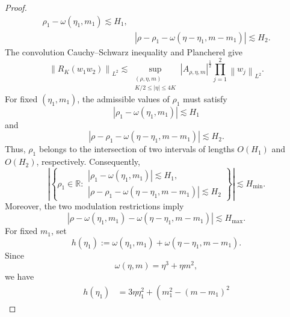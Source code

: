 \documentclass[12pt,oneside,reqno]{amsart}
\numberwithin{equation}{section}
\theoremstyle{plain}
\def\R{{\mathbb R}}
\newcommand{\abs}[1]{%
    \left|#1\right|%
}
\newcommand{\Lpn}[2]{%
    \left\lVert #1\right\rVert_{L^{#2}}%
}
\begin{document}
\begin{proof}
\begin{equation}
\begin{aligned}
{        \rho_1-\omega(\eta_1,m_1)
    }
    \lesssim H_1,
    \\
    &\abs{
        \rho-\rho_1
        -
        \omega(\eta-\eta_1,m-m_1)
    }
    \lesssim H_2.
\end{aligned}
\end{equation}
The convolution Cauchy--Schwarz inequality and Plancherel give
\begin{equation}
\label{eq:case6-convolution-CS}
    \Lpn{R_K(w_1w_2)}{2}
    \lesssim
    \sup_{\substack{
        (\rho,\eta,m)\\
        K/2\leq\abs{\eta}\leq4K
    }}
    \abs{A_{\rho,\eta,m}}^{\frac12}
    \prod_{j=1}^2
    \Lpn{w_j}{2}.
\end{equation}
For fixed $(\eta_1,m_1)$, the admissible values of $\rho_1$ must satisfy
\begin{equation}
    \abs{\rho_1-\omega(\eta_1,m_1)}
    \lesssim H_1
\end{equation}
and
\begin{equation}
    \abs{
        \rho-\rho_1-\omega(\eta-\eta_1,m-m_1)
    }
    \lesssim H_2.
\end{equation}
Thus, $\rho_1$ belongs to the intersection of two intervals of lengths
$O(H_1)$ and $O(H_2)$, respectively. Consequently,
\begin{equation}
\label{eq:case6-rho1-fiber}
\left|
\left\{
\rho_1\in\R:
\begin{array}{l}
\abs{\rho_1-\omega(\eta_1,m_1)}\lesssim H_1,\\[1mm]
\abs{\rho-\rho_1-\omega(\eta-\eta_1,m-m_1)}\lesssim H_2
\end{array}
\right\}
\right|
\lesssim
H_{\min}.
\end{equation}
Moreover, the two modulation restrictions imply
\begin{equation}
\label{eq:case6-resonance-restriction}
    \abs{
        \rho
        -
        \omega(\eta_1,m_1)
        -
        \omega(\eta-\eta_1,m-m_1)
    }
    \lesssim H_{\max}.
\end{equation}
For fixed $m_1$, set
\begin{equation}
    h(\eta_1)
    :=
    \omega(\eta_1,m_1)
    +
    \omega(\eta-\eta_1,m-m_1).
\end{equation}
Since
\begin{equation}
    \omega(\eta,m)
    =
    \eta^3+\eta m^2,
\end{equation}
we have
\begin{align}
h(\eta_1)
&=
3\eta\eta_1^2
+
\left(
    m_1^2
    -(m-m_1)^2

\end{align}
\end{proof}
\end{document}
